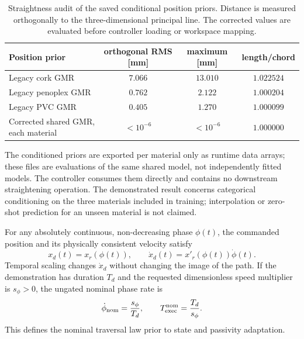\documentclass[11pt,a4paper]{article}
\begin{document}
\begin{table}[h]
\centering
\begin{tabular}{lccc}
\toprule
Position prior & orthogonal RMS [mm] & maximum [mm] & length/chord\\
\midrule
Legacy cork GMR & $7.066$ & $13.010$ & $1.022524$\\
Legacy penoplex GMR & $0.762$ & $2.122$ & $1.000204$\\
Legacy PVC GMR & $0.405$ & $1.270$ & $1.000099$\\
Corrected shared GMR, each material & $<10^{-6}$ & $<10^{-6}$ & $1.000000$\\
\bottomrule
\end{tabular}
\caption{Straightness audit of the saved conditional position priors. Distance
is measured orthogonally to the three-dimensional principal line. The
corrected values are evaluated before controller loading or workspace mapping.}
\label{tab:gmr_straightness}
\end{table}

The conditioned priors are exported per material only as runtime data arrays;
these files are evaluations of the same shared model, not independently fitted
models. The controller consumes them directly and contains no downstream
straightening operation. The demonstrated result concerns categorical
conditioning on the three materials included in training; interpolation or
zero-shot prediction for an unseen material is not claimed.

For any absolutely continuous,
non-decreasing phase $\phi(t)$, the commanded position and its physically
consistent velocity satisfy
\begin{equation}
x_d(t)=x_r(\phi(t)),\qquad
\dot x_d(t)=x'_r(\phi(t))\dot\phi(t).
\label{eq:phase_chain_rule}
\end{equation}
Temporal scaling changes $\dot x_d$ without changing the image of the path.
If the demonstration has
duration $T_d$ and the requested dimensionless speed multiplier is
$s_\phi>0$, the ungated nominal phase rate is
\begin{equation}
\dot\phi_{\rm nom}=\frac{s_\phi}{T_d},
\qquad
T_{\rm exec}^{\rm nom}=\frac{T_d}{s_\phi}.
\label{eq:nominal_phase_rate}
\end{equation}
This defines the nominal traversal law prior to state and passivity adaptation.
\end{document}

